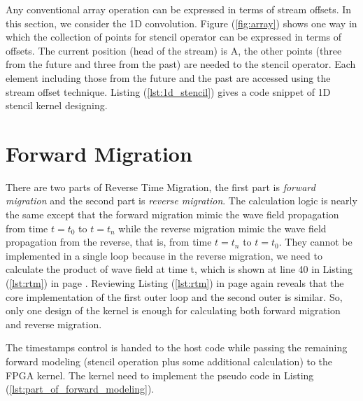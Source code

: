 \begin{figure}
  
\end{figure}

Any conventional array operation can be expressed in terms of stream
offsets. In this section, we consider the 1D convolution. Figure
(\ref{fig:array}) shows one way in which the collection of points for
stencil operator can be expressed in terms of offsets. The current position
(head of the stream) is A, the other points (three from the future and
three from the past) are needed to the stencil operator. Each element
including those from the future and the past are accessed using the stream
offset technique. Listing (\ref{lst:1d_stencil}) gives a code snippet of 1D
stencil kernel designing.



\section{Forward Migration } %
\label{sub:Forward Migration }

There are two parts of Reverse Time Migration, the first part is
\emph{forward migration} and the second part is \emph{reverse migration}.
The calculation logic is nearly the same except that the forward migration
mimic the wave field propagation from time \( t=t_0 \) to \( t=t_n \) while
the reverse migration mimic the wave field propagation from the reverse,
that is, from time \( t = t_n \) to \( t = t_0 \). They cannot be
implemented in a single loop because in the reverse migration, we need to
calculate the product of wave field at time t, which is shown at line 40 in
Listing (\ref{lst:rtm}) in page \pageref{lst:rtm}. Reviewing Listing
(\ref{lst:rtm}) in page \pageref{lst:rtm} again reveals that the core
implementation of the first outer loop and the second outer is similar. So,
only one design of the kernel is enough for calculating both forward
migration and reverse migration.

\begin{figure}
  \centering
  
\end{figure}

The timestamps control is handed to the host code while passing the
remaining forward modeling (stencil operation plus some additional
calculation) to the FPGA kernel. The kernel need to implement the pseudo
code in Listing (\ref{lst:part_of_forward_modeling}).


